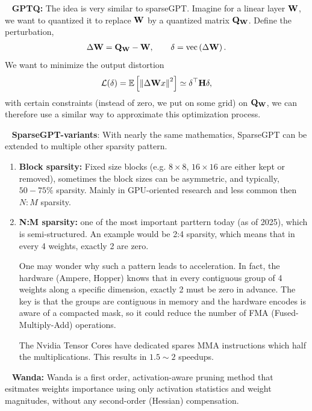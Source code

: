 \documentclass[11pt]{article}  %
\begin{document}
\textbullet~ \textbf{GPTQ:} The idea is very similar to sparseGPT.
Imagine for a linear layer $\mathbf{W}$, we want to quantized it to replace $\mathbf{W}$ by a quantized matrix $\mathbf{Q}_{\mathbf{W}}$.
Define the perturbation, 
\begin{align*}
  \Delta \mathbf{W} = \mathbf{Q}_{\mathbf{W}} - \mathbf{W}, \qquad \delta = \text{vec}\left( \Delta \mathbf{W} \right).
\end{align*}
We want to minimize the output distortion 
\begin{align*}
  \mathcal{L}(\delta) = \mathbb{E}\left[\left\lVert \Delta\mathbf{W} x \right\rVert^2\right] \simeq \delta^{\top}\mathbf{H}\delta, 
\end{align*}
with certain constraints (instead of zero, we put on some grid) on $\mathbf{Q}_{\mathbf{W}}$, we can therefore use a similar way to approximate this optimization process.


\textbullet~ \textbf{SparseGPT-variants}: With nearly the same mathematics, SparseGPT can be extended to multiple other sparsity pattern.
\begin{enumerate}
  \item \textbf{Block sparsity:} Fixed size blocks (e.g. $8 \times 8$, $16 \times 16$ are either kept or removed), sometimes the block sizes can be asymmetric, and typically, $50-75\%$ sparsity.
  Mainly in GPU-oriented research and less common then $N:M$ sparsity.

  \item \textbf{N:M sparsity:} one of the most important parttern today (as of 2025), which is semi-structured.
  An example would be 2:4 sparsity, which means that in every 4 weights, exactly 2 are zero.

  One may wonder why such a pattern leads to acceleration.
  In fact, the hardware (Ampere, Hopper) knows that in every contiguous group of 4 weights along a specific dimension, exactly 2 must be zero in advance.
  The key is that the groups are contiguous in memory and the hardware encodes is aware of a compacted mask, so it could reduce the number of FMA (Fused-Multiply-Add) operations.

  The Nvidia Tensor Cores have dedicated spares MMA instructions which half the multiplications.
  This results in $1.5 \sim 2$ speedups.
\end{enumerate}


\textbullet~ \textbf{Wanda:} Wanda is a first order, activation-aware pruning method that esitmates weights importance using only activation statistics and weight magnitudes, without any second-order (Hessian) compensation.
\end{document}
